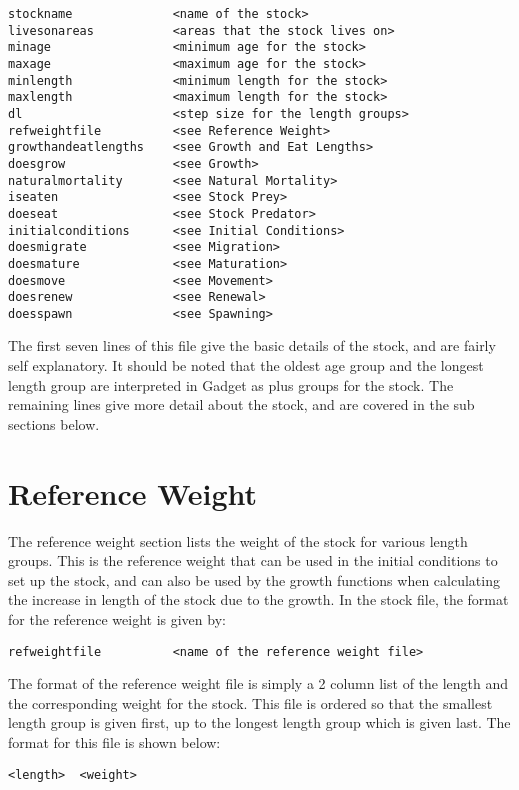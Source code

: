 \documentclass [a4paper, 10pt]{book}
\begin{document}
{\small\begin{verbatim}
stockname              <name of the stock>
livesonareas           <areas that the stock lives on>
minage                 <minimum age for the stock>
maxage                 <maximum age for the stock>
minlength              <minimum length for the stock>
maxlength              <maximum length for the stock>
dl                     <step size for the length groups>
refweightfile          <see Reference Weight>
growthandeatlengths    <see Growth and Eat Lengths>
doesgrow               <see Growth>
naturalmortality       <see Natural Mortality>
iseaten                <see Stock Prey>
doeseat                <see Stock Predator>
initialconditions      <see Initial Conditions>
doesmigrate            <see Migration>
doesmature             <see Maturation>
doesmove               <see Movement>
doesrenew              <see Renewal>
doesspawn              <see Spawning>
\end{verbatim}}

The first seven lines of this file give the basic details of the stock, and are fairly self explanatory.  It should be noted that the oldest age group and the longest length group are interpreted in Gadget as plus groups for the stock.  The remaining lines give more detail about the stock, and are covered in the sub sections below.

\section{Reference Weight}\label{subsec:stockrefweight}
The reference weight section lists the weight of the stock for various length groups.  This is the reference weight that can be used in the initial conditions to set up the stock, and can also be used by the growth functions when calculating the increase in length of the stock due to the growth.  In the stock file, the format for the reference weight is given by:

{\small\begin{verbatim}
refweightfile          <name of the reference weight file>
\end{verbatim}}

The format of the reference weight file is simply a 2 column list of the length and the corresponding weight for the stock.  This file is ordered so that the smallest length group is given first, up to the longest length group which is given last.  The format for this file is shown below:

{\small\begin{verbatim}
<length>  <weight>
\end{verbatim}}
\end{document}
